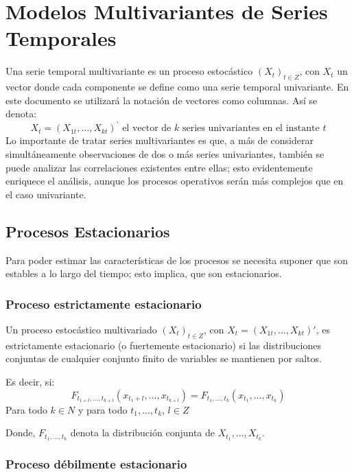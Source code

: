 \chapter{Modelos Multivariantes de Series Temporales}
\label{sec:mylabel2}

Una serie temporal multivariante es un proceso estoc\'{a}stico ${(X_{t})}_{t\in Z}$, con $X_{t}$ un vector donde cada componente se define como una serie temporal univariante. En este documento se utilizar\'{a} la notaci\'{o}n de vectores como columnas. As\'{i} se denota:
\[
X_{t}=(X_{1t}, \ldots, X_{kt})^{'} \text{ el vector de $k$ series univariantes en el instante $t$}
\]
Lo importante de tratar series multivariantes es que, a m\'{a}s de considerar simult\'{a}neamente observaciones de dos o m\'{a}s series univariantes, tambi\'{e}n se puede analizar las correlaciones existentes entre ellas; esto evidentemente enriquece el an\'{a}lisis, aunque los procesos operativos ser\'{a}n m\'{a}s complejos que en el caso univariante.

\section{Procesos Estacionarios}
\label{subsec:mylabel5}

Para poder estimar las caracter\'{i}sticas de los procesos se necesita suponer que son estables a lo largo del tiempo; esto implica, que son estacionarios. 

\subsection{Proceso estrictamente estacionario}
\label{subsubsec:mylabel1}

Un proceso estoc\'{a}stico multivariado ${(X_{t})}_{t\in Z}$, con $X_{t}=(X_{1t},\ldots ,X_{kt})'$, es estrictamente estacionario (o fuertemente estacionario) si las distribuciones conjuntas de cualquier 
conjunto finito de variables se mantienen por saltos. 

Es decir, si:
\[
F_{t_{1+l},\ldots, t_{k+l}}\left( x_{t_{1}+l},\ldots, x_{t_{k+l}} \right)=
F_{t_{1},\ldots ,t_{k}}\left( x_{t_{1}},\ldots, x_{t_{k}} \right)
\]
Para todo $k\in N$ y para todo $t_{1},\ldots , t_{k}$, $l\in Z$ 

Donde, $F_{t_{1},\ldots ,t_{k}}$ denota la distribuci\'{o}n conjunta de $X_{t_{1}},\ldots , X_{t_{k}}$.

\subsection{Proceso d\'{e}bilmente estacionario}
\label{subsubsec:mylabel2}

